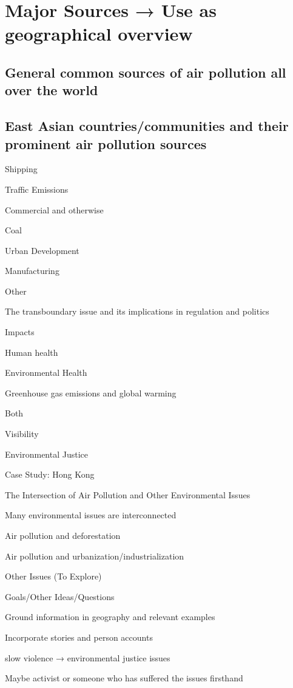 \documentclass{book}\usepackage{knitr}
\begin{document}
\section{Major Sources → Use as geographical overview}

\subsection{General common sources of air pollution all over the world}

\subsection{East Asian countries/communities and their prominent air pollution sources}

Shipping

Traffic Emissions

Commercial and otherwise

Coal

Urban Development

Manufacturing

Other

The transboundary issue and its implications in regulation and politics

Impacts

Human health

Environmental Health

Greenhouse gas emissions and global warming

Both

Visibility

Environmental Justice

Case Study: Hong Kong

The Intersection of Air Pollution and Other Environmental Issues

Many environmental issues are interconnected

Air pollution and deforestation

Air pollution and urbanization/industrialization

Other Issues (To Explore)

Goals/Other Ideas/Questions

Ground information in geography and relevant examples

Incorporate stories and person accounts

slow violence → environmental justice issues

Maybe activist or someone who has suffered the issues firsthand
\end{document}
